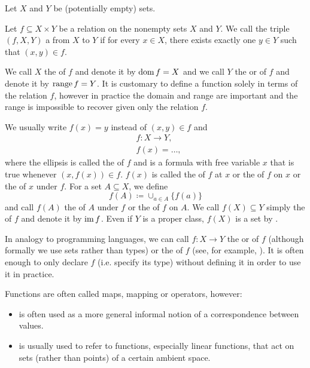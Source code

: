 \begin{definition}\label{def:function}
  Let \( X \) and \( Y \) be (potentially empty) sets.

  Let \( f \subseteq X \times Y \) be a relation on the nonempty sets \( X \) and \( Y \). We call the triple \( (f, X, Y) \) a  from \( X \) to \( Y \) if for every \( x \in X \), there exists exactly one \( y \in Y \) such that \( (x, y) \in f \).

  We call \( X \) the  of \( f \) and denote it by \( \operatorname{dom} f = X \) and we call \( Y \) the  or  of \( f \) and denote it by \( \operatorname{range} f = Y \). It is customary to define a function solely in terms of the relation \( f \), however in practice the domain and range are important and the range is impossible to recover given only the relation \( f \).

  We usually write \( f(x) = y \) instead of \( (x, y) \in f \) and
  \begin{align*}
    &f: X \to Y, \\
    &f(x) = \ldots,
  \end{align*}
  where the ellipsis is called the  of \( f \) and is a formula with free variable \( x \) that is true whenever \( (x, f(x)) \in f \). \( f(x) \) is called the  of \( f \) at \( x \) or the  of \( f \) on \( x \) or the  of \( x \) under \( f \). For a set \( A \subseteq X \), we define
  \begin{equation*}
    f(A) \coloneqq \cup_{a \in A} \{ f(a) \}
  \end{equation*}
  and call \( f(A) \) the  of \( A \) under \( f \) or the  of \( f \) on \( A \). We call \( f(X) \subseteq Y \) simply the  of \( f \) and denote it by \( \operatorname{im} f \). Even if \( Y \) is a proper class, \( f(X) \) is a set by .

  In analogy to programming languages, we can call \( f: X \to Y \) the  or  of \( f \) (although formally we use sets rather than types) or the  of \( f \) (see, for example, \cite[section 2.4]{Kernighan1988}). It is often enough to only declare \( f \) (i.e. specify its type) without defining it in order to use it in practice.

  Functions are often called maps, mapping or operators, however:
  \begin{itemize}
    \item {} is often used as a more general informal notion of a correspondence between values.
    \item {} is usually used to refer to functions, especially linear functions, that act on sets (rather than points) of a certain ambient space.
  \end{itemize}


\end{definition}
